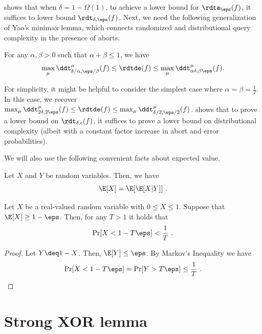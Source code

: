 \documentclass{toc}
\begin{document}
 shows that when $\delta = 1-\Omega(1)$, to
achieve a lower bound for $\rdta_\eps(f)$, it suffices to lower bound
$\rdt_{\delta,\eps}(f)$.
Next, we need the following generalization of Yao's minimax lemma,
which connects randomized and distributional query complexity in the
presence of aborts.
\begin{fact}
\label{fact:yao-abort}
For any $\alpha,\beta>0$ such that $\alpha+\beta \leq 1$, we have
\[
\max_\mu \ddt_{\delta/\alpha, \eps/\beta}^\mu(f) \leq \rdtde(f)
    \leq \max_{\mu} \ddt_{\alpha\delta, \beta\eps}^\mu(f).
\]
\end{fact}
For simplicity, it might be helpful to consider the simplest case
where $\alpha = \beta = \frac{1}{2}$.  In this case, we recover
$\max_\mu \ddt_{2\delta, 2\eps}^\mu(f) \leq \rdtde(f) \leq \max_{\mu}
\ddt_{\delta/2, \eps/2}^\mu(f)$.   shows that
to prove a lower bound on $\rdt_{\delta,\epsilon}(f)$, it suffices to
prove a lower bound on distributional complexity (albeit with a
constant factor increase in abort and error probabilities).

%
We will also use the following convenient facts about expected value.
\begin{fact}\label{fact:prob-ex2}
  Let $X$ and $Y$ be random variables.  Then, we have $$\E[X] = \E[\E[X|Y]]\ .$$
\end{fact}

%
%
%
%
%
%
%
%
%
%
%
%
%
%
%
%
%
%
%
%

\begin{fact}\label{fact:bounded-markov}
  Let $X$ be a real-valued random variable with $0\leq X \leq 1$.
  Suppose that $\E[X] \geq 1-\eps$.  Then, for any $T>1$ it holds that
  $$\Pr[X<1-T\eps] < \frac{1}{T}\ .$$
\end{fact}
\begin{proof}
  Let $Y \deq 1-X$.  Then, $\E[Y] \leq \eps$.  By Markov's Inequality
  we have
\begin{equation*}
  \Pr[X<1-T\eps] = \Pr[Y > T\eps] \leq \frac{1}{T}\ .\qedhere
\end{equation*}
\end{proof}

%
\section{Strong XOR lemma}\label{sec:main}   %
\end{document}
